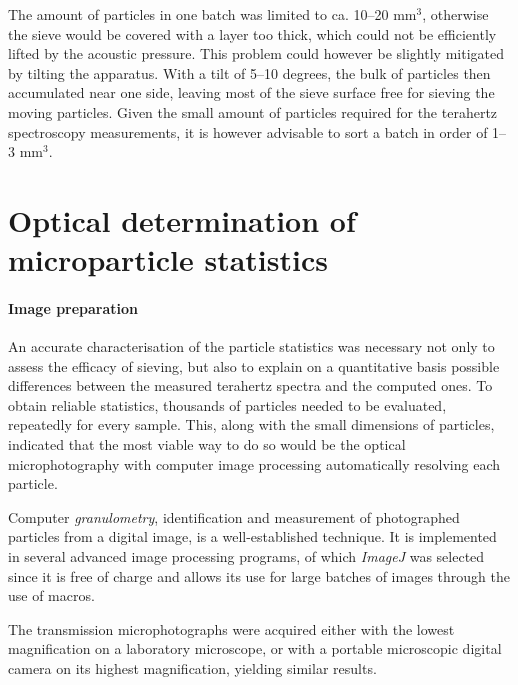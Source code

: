 The amount of particles in one batch was limited to ca. 10--20 mm$^{3}$, otherwise the sieve would be covered with a layer too thick, which could not be efficiently lifted by the acoustic pressure.
This problem could however be slightly mitigated by tilting the apparatus. With a tilt of 5--10 degrees, the bulk of particles then accumulated near one side, leaving most of the sieve surface free for sieving the moving particles. Given the small amount of particles required for the terahertz spectroscopy measurements, it is however advisable to sort a batch in order of 1--3 mm$^{3}$.

\section{Optical determination of microparticle statistics}
\paragraph{Image preparation} %
An accurate characterisation of the particle statistics was necessary not only to assess the efficacy of sieving, but also to explain  on a quantitative basis possible differences between the measured terahertz spectra and the computed ones. To obtain reliable statistics, thousands of particles needed to be evaluated, repeatedly for every sample. This, along with the small dimensions of particles, indicated that the most viable way to do so would be the optical microphotography with computer image processing automatically resolving each particle.

Computer \textit{granulometry}, identification and measurement of photographed particles from a digital image,
is a well-established technique. It is implemented in several advanced image processing programs, of which \textit{ImageJ} was selected \cite{abramoff2004image} since it is free of charge and allows its use for large batches of images through the use of macros. 

The transmission microphotographs were acquired either with the lowest magnification on a laboratory microscope, or with a portable microscopic digital camera on its highest magnification, yielding similar results.

